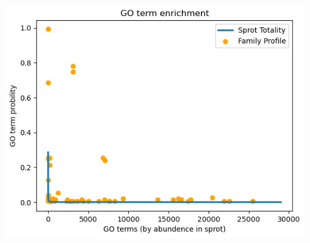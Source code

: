 \documentclass[10pt,twocolumn,letterpaper]{article}
\begin{document}
\begin{center}
    \includegraphics[scale=0.4]{report/img/go_term_enrichment.png}
\end{center}
\end{document}
